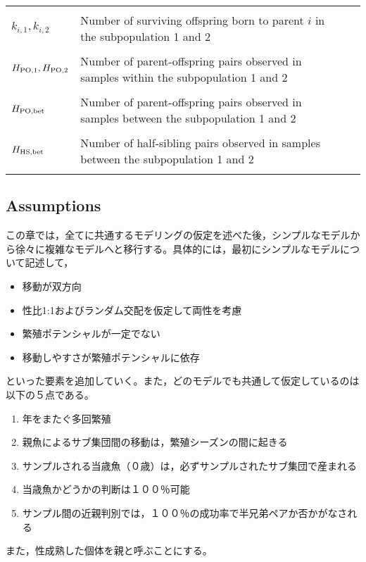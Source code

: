\documentclass[AMA,STIX1COL]{WileyNJD-v2}
\begin{document}
\begin{table}[tb]
\begin{center}
\begin{tabular}{llc}
		                						& \\
	$k_{i,1}, k_{i,2}$					& Number of surviving offspring born to parent $i$ in the subpopulation 1 and 2\\ 
	                							& \\
	$H_{\rm PO, 1}, H_{\rm PO, 2}$		& Number of parent-offspring pairs observed in samples within the subpopulation 1 and 2\\ 
	                							& \\
	$H_{\rm PO, bet}$					& Number of parent-offspring pairs observed in samples between the subpopulation 1 and 2\\ 
	                							& \\
	$H_{\rm HS, bet}$					& Number of half-sibling pairs observed in samples between the subpopulation 1 and 2\\ 
	                							& \\              		
	\hline
    \end{tabular}
    \label{symbols} 
\end{center} 
\end{table}
\renewcommand{\arraystretch}{1}

\subsection{Assumptions}

この章では，全てに共通するモデリングの仮定を述べた後，シンプルなモデルから徐々に複雑なモデルへと移行する。具体的には，最初にシンプルなモデルについて記述して，
\begin{itemize}
  \item 移動が双方向
  \item 性比1:1およびランダム交配を仮定して両性を考慮
  \item 繁殖ポテンシャルが一定でない
  \item 移動しやすさが繁殖ポテンシャルに依存
\end{itemize}
といった要素を追加していく。また，どのモデルでも共通して仮定しているのは以下の５点である。
\begin{enumerate}
  \item 年をまたぐ多回繁殖
  \item 親魚によるサブ集団間の移動は，繁殖シーズンの間に起きる
  \item サンプルされる当歳魚（０歳）は，必ずサンプルされたサブ集団で産まれる
  \item 当歳魚かどうかの判断は１００％可能
  \item サンプル間の近親判別では，１００％の成功率で半兄弟ペアか否かがなされる
\end{enumerate}
また，性成熟した個体を親と呼ぶことにする。
\end{document}
